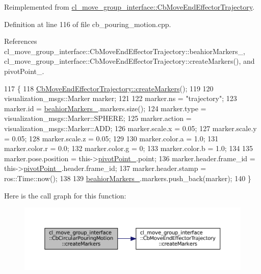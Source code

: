 Reimplemented from \hyperlink{classcl__move__group__interface_1_1CbMoveEndEffectorTrajectory_a442efa1d5bc9e9a16f74ecd31b13d9b5}{cl\+\_\+move\+\_\+group\+\_\+interface\+::\+Cb\+Move\+End\+Effector\+Trajectory}.



Definition at line 116 of file cb\+\_\+pouring\+\_\+motion.\+cpp.



References cl\+\_\+move\+\_\+group\+\_\+interface\+::\+Cb\+Move\+End\+Effector\+Trajectory\+::beahior\+Markers\+\_\+, cl\+\_\+move\+\_\+group\+\_\+interface\+::\+Cb\+Move\+End\+Effector\+Trajectory\+::create\+Markers(), and pivot\+Point\+\_\+.


\begin{DoxyCode}
117     \{
118         \hyperlink{classcl__move__group__interface_1_1CbMoveEndEffectorTrajectory_a442efa1d5bc9e9a16f74ecd31b13d9b5}{CbMoveEndEffectorTrajectory::createMarkers}();
119 
120         visualization\_msgs::Marker marker;
121 
122         marker.ns = \textcolor{stringliteral}{"trajectory"};
123         marker.id = \hyperlink{classcl__move__group__interface_1_1CbMoveEndEffectorTrajectory_a809fb5385adf27c0a1c8f8136566949c}{beahiorMarkers\_}.markers.size();
124         marker.type = visualization\_msgs::Marker::SPHERE;
125         marker.action = visualization\_msgs::Marker::ADD;
126         marker.scale.x = 0.05;
127         marker.scale.y = 0.05;
128         marker.scale.z = 0.05;
129 
130         marker.color.a = 1.0;
131         marker.color.r = 0.0;
132         marker.color.g = 0;
133         marker.color.b = 1.0;
134 
135         marker.pose.position = this->\hyperlink{classcl__move__group__interface_1_1CbCircularPouringMotion_a4c100d8ba3e57f7ddfb614017d115fca}{pivotPoint\_}.point;
136         marker.header.frame\_id = this->\hyperlink{classcl__move__group__interface_1_1CbCircularPouringMotion_a4c100d8ba3e57f7ddfb614017d115fca}{pivotPoint\_}.header.frame\_id;
137         marker.header.stamp = ros::Time::now();
138 
139         \hyperlink{classcl__move__group__interface_1_1CbMoveEndEffectorTrajectory_a809fb5385adf27c0a1c8f8136566949c}{beahiorMarkers\_}.markers.push\_back(marker);
140     \}
\end{DoxyCode}
Here is the call graph for this function\+:
\nopagebreak
\begin{figure}[H]
\begin{center}
\leavevmode
\includegraphics[width=350pt]{classcl__move__group__interface_1_1CbCircularPouringMotion_a26d603b1d9bdbf5b71da6c1c4af2c322_cgraph}
\end{center}
\end{figure}

